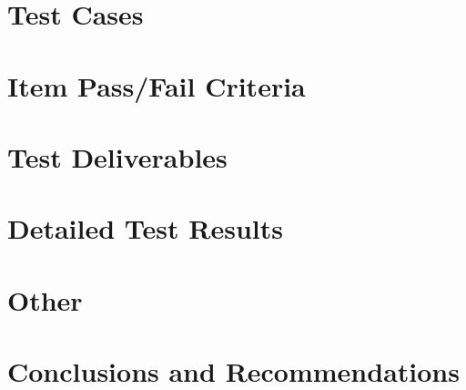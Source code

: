 \documentclass[11pt,fleqn]{book} %
\begin{document}
\chapter{Test Cases}
	


\chapter{Item Pass/Fail Criteria}
	


\chapter{Test Deliverables}
	


\chapter{Detailed Test Results}



\chapter{Other}


\chapter{Conclusions and Recommendations}
\end{document}
